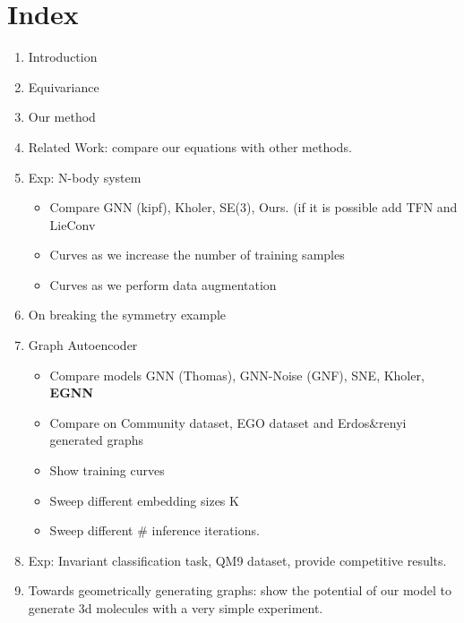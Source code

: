 \section{Index}

\begin{enumerate}
    \item Introduction
    \item Equivariance
    \item Our method
    \item Related Work: compare our equations with other methods.
    \item Exp: N-body system
    \begin{itemize}
        \item Compare GNN (kipf), Kholer, SE(3), Ours. (if it is possible add TFN and LieConv
        \item Curves as we increase the number of training samples
        \item Curves as we perform data augmentation
    \end{itemize}
    \item On breaking the symmetry example
    \item Graph Autoencoder
        \begin{itemize}
            \item Compare models GNN (Thomas), GNN-Noise (GNF), SNE, Kholer, \textbf{EGNN}
            \item Compare on Community dataset, EGO dataset and Erdos\&renyi generated graphs
            \item Show training curves
            \item Sweep different embedding sizes K
            \item Sweep different \# inference iterations.
        \end{itemize}
    \item Exp: Invariant classification task, QM9 dataset, provide competitive results.
    \item Towards geometrically generating graphs: show the potential of our model to generate 3d molecules with a very simple experiment.
    
\end{enumerate}